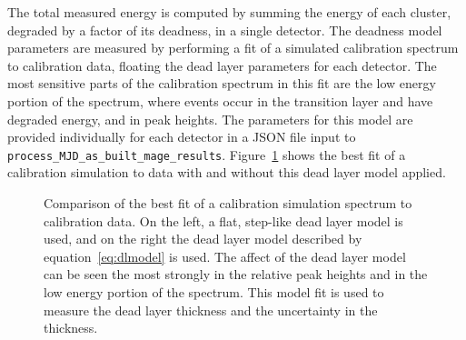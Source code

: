 \documentclass[/main.tex]{subfiles}
\begin{document}
The total measured energy is computed by summing the energy of each cluster, degraded by a factor of its deadness, in a single detector.
The deadness model parameters are measured by performing a fit of a simulated  calibration spectrum to calibration data, floating the dead layer parameters for each detector.
The most sensitive parts of the calibration spectrum in this fit are the low energy portion of the spectrum, where events occur in the transition layer and have degraded energy, and in peak heights.
The parameters for this model are provided individually for each detector in a JSON file input to \texttt{process\_MJD\_as\_built\_mage\_results}.
Figure~\ref{fig:calwithdl} shows the best fit of a  calibration simulation to data with and without this dead layer model applied.
\begin{figure}
  \centering
  \caption[Comparison of calibration simulation to data with different dead layer models]{\label{fig:calwithdl}
    Comparison of the best fit of a  calibration simulation spectrum to calibration data. On the left, a flat, step-like dead layer model is used, and on the right the dead layer model described by equation~\ref{eq:dlmodel} is used. The affect of the dead layer model can be seen the most strongly in the relative peak heights and in the low energy portion of the spectrum. This model fit is used to measure the dead layer thickness and the uncertainty in the thickness.
  }
\end{figure}
\end{document}
